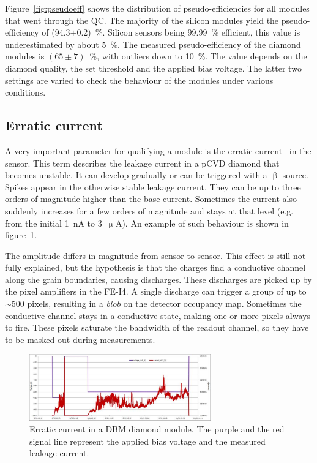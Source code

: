 Figure~\ref{fig:pseudoeff} shows the distribution of pseudo-efficiencies for all modules that went through the QC. The majority of the silicon modules yield the pseudo-efficiency of (94.3$\pm$0.2)~\%. Silicon sensors being 99.99~\% efficient, this value is underestimated by about 5~\%. The measured pseudo-efficiency of the diamond modules is $(65\pm7)$~\%, with outliers down to 10~\%. The value depends on the diamond quality, the set threshold and the applied bias voltage. The latter two settings are varied to check the behaviour of the modules under various conditions. 

\subsection{Erratic current}
A very important parameter for qualifying a module is the erratic current~\cite{Mueller:1175553} in the sensor. This term describes the leakage current in a pCVD diamond that becomes unstable. It can develop gradually or can be triggered with a $\upbeta$ source. Spikes appear in the otherwise stable leakage current. They can be up to three orders of magnitude higher than the base current. Sometimes the current also suddenly increases for a few orders of magnitude and stays at that level (e.g. from the initial 1~nA to 3~$\upmu$A). An example of such behaviour is shown in figure~\ref{fig:erratic1}. 

The amplitude differs in magnitude from sensor to sensor. This effect is still not fully explained, but the hypothesis is that the charges find a conductive channel along the grain boundaries, causing discharges. These discharges are picked up by the pixel amplifiers in the FE-I4. A single discharge can trigger a group of up to $\sim$500 pixels, resulting in a \emph{blob} on the detector occupancy map. Sometimes the conductive channel stays in a conductive state, making one or more pixels always to fire. These pixels saturate the bandwidth of the readout channel, so they have to be masked out during measurements. 

\begin{figure}[!t]
\centering
\includegraphics[width=0.7\textwidth]{04_charge_monitoring/pics/erratic1} 
\caption{Erratic current in a DBM diamond module. The purple and the red signal line represent the applied bias voltage and the measured leakage current.}
\label{fig:erratic1}
\end{figure}

